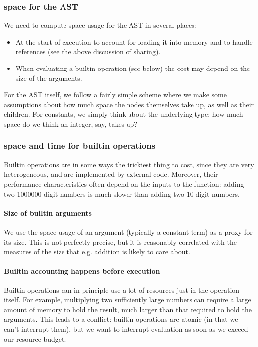 \subsubsection{\gls{space} for the AST}
We need to compute \gls{space} usage for the AST in several places:
\begin{itemize}
\item At the start of execution to account for loading it into memory and to handle references (see the above discussion of sharing).
\item When evaluating a builtin operation (see below) the cost may depend on the size of  the arguments.
\end{itemize}

For the AST itself, we follow a fairly simple scheme where we make some assumptions about how much space the nodes themselves take up, as well as their children.
For constants, we simply think about the underlying type: how much space do we think an integer, say, takes up?

\subsubsection{\gls{space} and \gls{time} for builtin operations}
Builtin operations are in some ways the trickiest thing to cost, since they are very heterogeneous, and are implemented by external code.
Moreover, their performance characteristics often depend on the inputs to the function: adding two 1000000 digit numbers is much slower than adding two 10 digit numbers.

\paragraph{Size of builtin arguments}
We use the \gls{space} usage of an argument (typically a constant term) as a proxy for its size.
This is not perfectly precise, but it is reasonably correlated with the measures of the size that e.g. addition is likely to care about.

\paragraph{Builtin accounting happens before execution}
Builtin operations can in principle use a lot of resources just in the operation itself.
For example, multiplying two sufficiently large numbers can require a large amount of memory to hold the result, much larger than that required to hold the arguments.
This leads to a conflict: builtin operations are atomic (in that we can't interrupt them), but we want to interrupt evaluation as soon as we exceed our resource budget.

